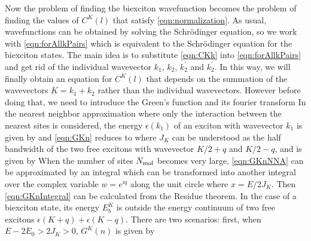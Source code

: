 Now the problem of finding the biexciton wavefunction becomes the problem of finding the values of $C^{K}(l)$ that 
satisfy \autoref{eqn:normalization}. As usual, wavefunctions can be obtained by solving the Schr{\" o}dinger equation, so
 we work with \autoref{eqn:forAllkPairs} which is equivalent to the Schr{\" o}dinger equation for the biexciton states. 
The main idea is to substitute \autoref{eqn:CKk} into \autoref{eqn:forAllkPairs} and get rid of the individual 
wavevector $k_1$, $k_2$, $k_2^{'}$ and $k_2^{'}$. In this way, we will finally obtain an equation for $C^{K}(l)$ that
 depends on the summation of the wavevectors $K = k_1 + k_2$ rather than the individual wavevectors. However 
before doing that, we need to introduce the Green's function
and its fourier transform
In the nearest neighbor approximation where only the interaction between the nearest sites is considered,  the energy $\epsilon(k_1)$ of an exciton with wavevector $k_1$ is given by
and \autoref{eqn:GKn} reduces to
where $J_{K}$ can be understood as the half bandwidth of the two free excitons with wavevector $K/2 + q$ and $K/2-q$,
 and is given by
When the number of sites $N_{\rm mol}$ becomes very large, \autoref{eqn:GKnNNA} can be approximated by an
 integral
which can be transformed into another integral over the complex variable $w=e^{iq}$ along the unit circle
where $x = E/2J_K $. Then \autoref{eqn:GKnIntegral} can be calculated from the Residue theorem. In the case of a
 biexciton state, its energy $E^{K}_{b}$ is outside the energy continuum of two free excitons 
$\epsilon(K+q) + \epsilon(K-q)$. There are  two scenarios:  first, when $E - 2 E_0 > 2 J_K >0$, $G^{K}(n)$ is given by
